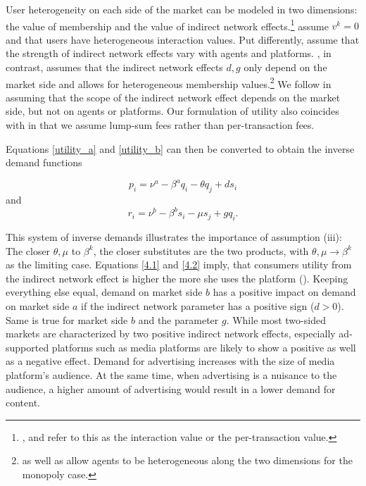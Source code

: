 \documentclass[12pt,a4paper,notitlepage]{article}
\begin{document}
User heterogeneity on each side of the market can be modeled in two dimensions: the value of membership and the value of indirect network effects.\footnote{\cite{weyl_price_2010}, \cite{rochet_platform_2003} and \cite{armstrong_competition_2006} refer to this as the interaction value or the per-transaction value.} \cite{rochet_platform_2003} assume $v^k=0$ and that users have heterogeneous interaction values. Put differently, \cite{rochet_platform_2003} assume that the strength of indirect network effects vary with agents and platforms. \cite{armstrong_competition_2006}, in contrast, assumes that the indirect network effects $d,g$ only depend on the market side and allows for heterogeneous membership values.\footnote{\cite{rochet_platform_2003} as well as \cite{weyl_price_2010} allow agents to be heterogeneous along the two dimensions for the monopoly case.} We follow \cite{armstrong_competition_2006} in assuming that the scope of the indirect network effect depends on the market side, but not on agents or platforms. Our formulation of utility also coincides with \cite{armstrong_competition_2006} in that we assume lump-sum fees rather than per-transaction fees. 

Equations \ref{utility_a} and \ref{utility_b} can then be converted to obtain the inverse demand functions

\begin{equation}
p_i=\nu^a-\beta^a q_i - \theta q_j +ds_i
\end{equation}
and
\begin{equation}
r_i=\nu^b-\beta^b s_i - \mu s_j +gq_i.
\end{equation} 

This system of inverse demands illustrates the importance of assumption (iii): The closer $\theta, \mu$ to $\beta^k$, the closer substitutes are the two products, with $\theta, \mu \to \beta^ k$ as the limiting case. Equations \ref{4.1} and \ref{4.2} imply, that consumers utility from the indirect network effect is higher the more she uses the platform (\cite{kind_business_2009}). Keeping everything else equal, demand on market side $b$ has a positive impact on demand on market side $a$ if the indirect network parameter has a positive sign ($d > 0$). Same is true for market side $b$ and the parameter $g$. While most two-sided markets are characterized by two positive indirect network effects, especially ad-supported platforms such as media platforms are likely to show a positive as well as a negative effect. Demand for advertising increases with the size of media platform's audience. At the same time, when advertising is a nuisance to the audience, a higher amount of advertising would result in a lower demand for content.
\end{document}
